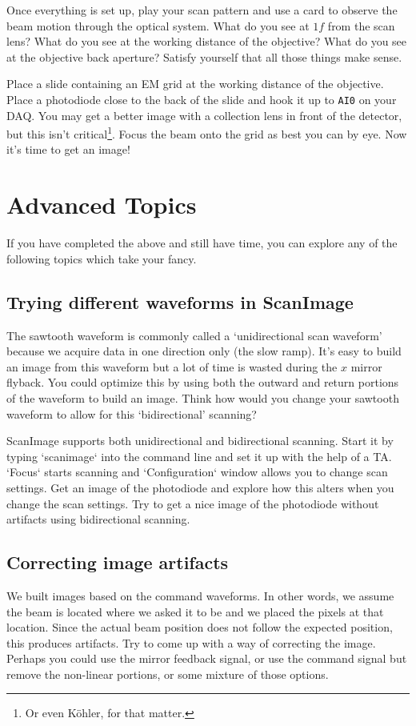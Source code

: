 \documentclass[a4paper]{report}
\begin{document}
\noindent
Once everything is set up, play your scan pattern and use a card to observe the beam motion through the optical system. 
What do you see at $1f$ from the scan lens?
What do you see at the working distance of the objective?
What do you see at the objective back aperture?
Satisfy yourself that all those things make sense.

\noindent
Place a slide containing an EM grid at the working distance of the objective. 
Place a photodiode close to the back of the slide and hook it up to \texttt{AI0} on your DAQ. 
You may get a better image with a collection lens in front of the detector, but this isn't critical\footnote{Or even K\"{o}hler, for that matter.}.
Focus the beam onto the grid as best you can by eye.
Now it's time to get an image!


\section{Advanced Topics}
If you have completed the above and still have time, you can explore any of the following topics which take your fancy.



\subsection{Trying different waveforms in ScanImage}
The sawtooth waveform is commonly called a `unidirectional scan waveform' because we acquire data in one direction only (the slow ramp). 
It's easy to build an image from this waveform but a lot of time is wasted during the $x$ mirror flyback. 
You could optimize this by using both the outward and return portions of the waveform to build an image. 
Think how would you change your sawtooth waveform to allow for this `bidirectional' scanning? 

ScanImage supports both unidirectional and bidirectional scanning. 
Start it by typing `scanimage` into the command line and set it up with the help of a TA. 
`Focus` starts scanning and `Configuration` window allows you to change scan settings. 
Get an image of the photodiode and explore how this alters when you change the scan settings. 
Try to get a nice image of the photodiode without artifacts using bidirectional scanning. 


\subsection{Correcting image artifacts}
We built images based on the command waveforms. 
In other words, we assume the beam is located where we asked it to be and we placed the pixels at that location.
Since the actual beam position does not follow the expected position, this produces artifacts. 
Try to come up with a way of correcting the image. 
Perhaps you could use the mirror feedback signal, or use the command signal but remove the non-linear portions, or some mixture of those options. 
\end{document}
